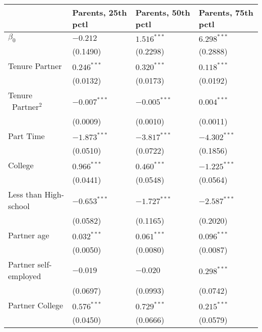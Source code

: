 \begin{tabular}{llll}
\toprule
{} & Parents, 25th pctl & Parents, 50th pctl & Parents, 75th pctl \\
\midrule
$\beta_0$                     &           $-0.212$ &      $1.516^{***}$ &      $6.298^{***}$ \\
                              &           (0.1490) &           (0.2298) &           (0.2888) \\
Tenure Partner                &      $0.246^{***}$ &      $0.320^{***}$ &      $0.118^{***}$ \\
                              &           (0.0132) &           (0.0173) &           (0.0192) \\
Tenure \ Partner$^{2}$        &     $-0.007^{***}$ &     $-0.005^{***}$ &      $0.004^{***}$ \\
                              &           (0.0009) &           (0.0010) &           (0.0011) \\
Part Time                     &     $-1.873^{***}$ &     $-3.817^{***}$ &     $-4.302^{***}$ \\
                              &           (0.0510) &           (0.0722) &           (0.1856) \\
College                       &      $0.966^{***}$ &      $0.460^{***}$ &     $-1.225^{***}$ \\
                              &           (0.0441) &           (0.0548) &           (0.0564) \\
Less than High-school         &     $-0.653^{***}$ &     $-1.727^{***}$ &     $-2.587^{***}$ \\
                              &           (0.0582) &           (0.1165) &           (0.2020) \\
Partner age                   &      $0.032^{***}$ &      $0.061^{***}$ &      $0.096^{***}$ \\
                              &           (0.0050) &           (0.0080) &           (0.0087) \\
Partner self-employed         &           $-0.019$ &           $-0.020$ &      $0.298^{***}$ \\
                              &           (0.0697) &           (0.0993) &           (0.0742) \\
Partner College               &      $0.576^{***}$ &      $0.729^{***}$ &      $0.215^{***}$ \\
                              &           (0.0450) &           (0.0666) &           (0.0579) \\

\end{tabular}
